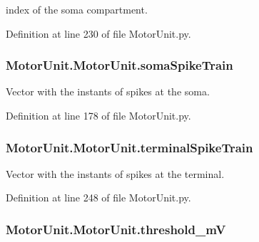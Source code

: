 index of the soma compartment. 



Definition at line 230 of file Motor\-Unit.\-py.

\hypertarget{class_motor_unit_1_1_motor_unit_a8c86d98daa6c509e226ab165fa92515f}{
\subsubsection[{soma\-Spike\-Train}]{\setlength{\rightskip}{0pt plus 5cm}Motor\-Unit.\-Motor\-Unit.\-soma\-Spike\-Train}}\label{class_motor_unit_1_1_motor_unit_a8c86d98daa6c509e226ab165fa92515f}


Vector with the instants of spikes at the soma. 



Definition at line 178 of file Motor\-Unit.\-py.

\hypertarget{class_motor_unit_1_1_motor_unit_a2e33990aaab69454943aa00db6b8d2eb}{
\subsubsection[{terminal\-Spike\-Train}]{\setlength{\rightskip}{0pt plus 5cm}Motor\-Unit.\-Motor\-Unit.\-terminal\-Spike\-Train}}\label{class_motor_unit_1_1_motor_unit_a2e33990aaab69454943aa00db6b8d2eb}


Vector with the instants of spikes at the terminal. 



Definition at line 248 of file Motor\-Unit.\-py.

\hypertarget{class_motor_unit_1_1_motor_unit_affbd0b90f1dce6a0f929775e54f8c212}{
\subsubsection[{threshold\-\_\-m\-V}]{\setlength{\rightskip}{0pt plus 5cm}Motor\-Unit.\-Motor\-Unit.\-threshold\-\_\-m\-V}}\label{class_motor_unit_1_1_motor_unit_affbd0b90f1dce6a0f929775e54f8c212}



